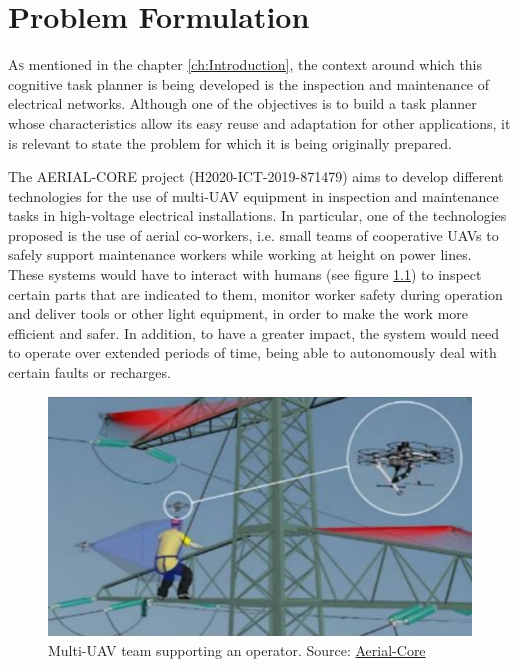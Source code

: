 \chapter{Problem Formulation}
\label{ch:ProblemFormulation}
\lettrine[lraise=-0.1, lines=2, loversize=0.2]{A}{s} mentioned in the chapter \ref{ch:Introduction}, the context around which this cognitive task planner is being developed is the inspection and maintenance of electrical networks. Although one of the objectives is to build a task planner whose characteristics allow its easy reuse and adaptation for other applications, it is relevant to state the problem for which it is being originally prepared. 

The AERIAL-CORE project (H2020-ICT-2019-871479) aims to develop different technologies for the use of multi-\gls{UAV} equipment in inspection and maintenance tasks in high-voltage electrical installations. In particular, one of the technologies proposed is the use of aerial co-workers, i.e. small teams of cooperative \glspl{UAV} to safely support maintenance workers while working at height on power lines. These systems would have to interact with humans (see figure \ref{fig:aerial_co_worker}) to inspect certain parts that are indicated to them, monitor worker safety during operation and deliver tools or other light equipment, in order to make the work more efficient and safer. In addition, to have a greater impact, the system would need to operate over extended periods of time, being able to autonomously deal with certain faults or recharges.

\begin{figure}[htbp]
    \centering
    \includegraphics[width=1\linewidth]
    {ProblemFormulation/figures/aerial_co_worker.jpeg}
    \caption{Multi-\gls{UAV} team supporting an operator. Source: \href{https://aerial-core.eu/}{Aerial-Core}}
    \label{fig:aerial_co_worker}
\end{figure}

